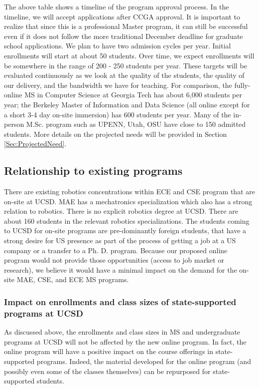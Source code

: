 \documentclass[11pt,letterpaper]{article}
\begin{document}
The above table shows a timeline of the program approval process. In
the timeline, we will accept applications after CCGA approval. It is
important to realize that since this is a professional Master program,
it can still be successful even if it does not follow the more
traditional December deadline for graduate school applications. We
plan to have two admission cycles per year. Initial enrollments will
start at about 50 students. Over time, we expect enrollments will be
somewhere in the range of 200 - 250 students per year. These targets
will be evaluated continuously as we look at the quality of the
students, the quality of our delivery, and the bandwidth we have for
teaching. For comparison, the fully-online MS in Computer Science at
Georgia Tech has about 6,000 students per year; the Berkeley Master of
Information and Data Science (all online except for a short 3-4 day
on-site immersion) has 600 students per year. Many of the in-person 
M.Sc. program such as UPENN, Utah, OSU have close to 150 admitted students. 
More details on the projected needs will be provided in Section \ref{Sec:ProjectedNeed}.

\subsection{Relationship to existing programs}


There are existing robotics concentrations within ECE and CSE program
that are on-site at UCSD. MAE has a mechatronics specialization which
also has a strong relation to robotics. There is no explicit robotics
degree at UCSD. There are about 160 students in the relevant robotics
specializations. The students coming to UCSD for on-site programs are
pre-dominantly foreign students, that have a strong desire for US
presence as part of the process of getting a job at a US company or a
transfer to a Ph. D. program. Because our proposed online program
would not provide those opportunities (access to job market or
research), we believe it would have a minimal impact on the demand for
the on-site MAE, CSE, and ECE MS programs.

\subsubsection{Impact on enrollments and class sizes of state-supported programs at UCSD​}

As discussed above, the enrollments and class sizes in MS and
undergraduate programs at UCSD will not be affected by the new online
program. In fact, the online program will have a positive impact on
the course offerings in state-supported programs. Indeed, the material
developed for the online program (and possibly even some of the
classes themselves) can be repurposed for state-supported students.
\end{document}
